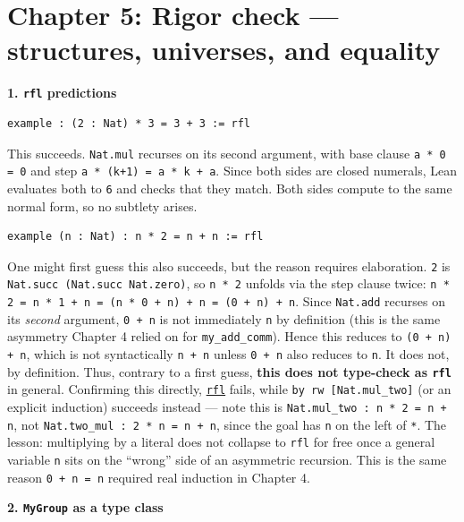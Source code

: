 \section{Chapter 5: Rigor check --- structures, universes, and equality}\label{sec:14-appendix-solutions:04-chapter-5:1}

\textbf{1. \texttt{rfl} predictions}

\begin{lstlisting}
example : (2 : Nat) * 3 = 3 + 3 := rfl
\end{lstlisting}

This succeeds. \texttt{Nat.mul} recurses on its second argument, with base clause \texttt{a * 0 = 0} and step \texttt{a * (k+1) = a * k + a}. Since both sides are closed numerals, Lean evaluates both to \texttt{6} and checks that they match. Both sides compute to the same normal form, so no subtlety arises.

\begin{lstlisting}
example (n : Nat) : n * 2 = n + n := rfl
\end{lstlisting}

One might first guess this also succeeds, but the reason requires elaboration. \texttt{2} is \texttt{Nat.succ (Nat.succ Nat.zero)}, so \texttt{n * 2} unfolds via the step clause twice: \texttt{n * 2 = n * 1 + n = (n * 0 + n) + n = (0 + n) + n}. Since \texttt{Nat.add} recurses on its \emph{second} argument, \texttt{0 + n} is not immediately \texttt{n} by definition (this is the same asymmetry Chapter 4 relied on for \texttt{my\_\allowbreak{}add\_\allowbreak{}comm}). Hence this reduces to \texttt{(0 + n) + n}, which is not syntactically \texttt{n + n} unless \texttt{0 + n} also reduces to \texttt{n}. It does not, by definition. Thus, contrary to a first guess, \textbf{this does not type-check as \texttt{rfl}} in general. Confirming this directly, \href{https://lean-lang.org/doc/reference/latest/Tactic-Proofs/Tactic-Reference/}{\texttt{rfl}} fails, while \texttt{by rw [Nat.mul\_\allowbreak{}two]} (or an explicit induction) succeeds instead --- note this is \texttt{Nat.mul\_\allowbreak{}two : n * 2 = n + n}, not \texttt{Nat.two\_\allowbreak{}mul : 2 * n = n + n}, since the goal has \texttt{n} on the left of \texttt{*}. The lesson: multiplying by a literal does not collapse to \texttt{rfl} for free once a general variable \texttt{n} sits on the ``wrong'' side of an asymmetric recursion. This is the same reason \texttt{0 + n = n} required real induction in Chapter 4.

\textbf{2. \texttt{MyGroup} as a type class}

